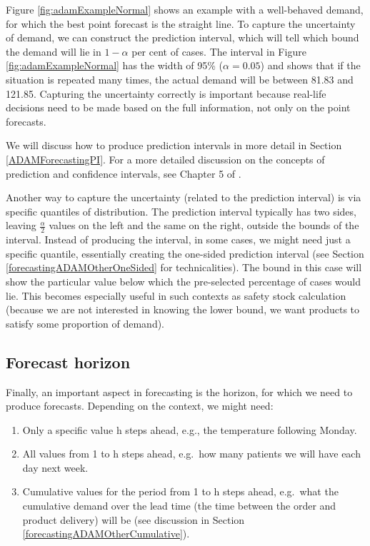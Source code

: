 \documentclass[
]{book}
\providecommand{\tightlist}{%
  \setlength{\itemsep}{0pt}\setlength{\parskip}{0pt}}
\theoremstyle{definition}
\theoremstyle{definition}
\theoremstyle{definition}
\theoremstyle{definition}
\theoremstyle{remark}
\begin{document}
Figure \ref{fig:adamExampleNormal} shows an example with a well-behaved demand, for which the best point forecast is the straight line. To capture the uncertainty of demand, we can construct the prediction interval, which will tell which bound the demand will lie in \(1-\alpha\) per cent of cases. The interval in Figure \ref{fig:adamExampleNormal} has the width of 95\% (\(\alpha=0.05\)) and shows that if the situation is repeated many times, the actual demand will be between 81.83 and 121.85. Capturing the uncertainty correctly is important because real-life decisions need to be made based on the full information, not only on the point forecasts.

We will discuss how to produce prediction intervals in more detail in Section \ref{ADAMForecastingPI}. For a more detailed discussion on the concepts of prediction and confidence intervals, see Chapter 5 of \citet{SvetunkovSBA}.

Another way to capture the uncertainty (related to the prediction interval) is via specific quantiles of distribution. The prediction interval typically has two sides, leaving \(\frac{\alpha}{2}\) values on the left and the same on the right, outside the bounds of the interval. Instead of producing the interval, in some cases, we might need just a specific quantile, essentially creating the one-sided prediction interval (see Section \ref{forecastingADAMOtherOneSided} for technicalities). The bound in this case will show the particular value below which the pre-selected percentage of cases would lie. This becomes especially useful in such contexts as safety stock calculation (because we are not interested in knowing the lower bound, we want products to satisfy some proportion of demand).

\hypertarget{forecast-horizon}{%
\subsection{Forecast horizon}\label{forecast-horizon}}

Finally, an important aspect in forecasting is the horizon, for which we need to produce forecasts. Depending on the context, we might need:

\begin{enumerate}
\def\labelenumi{\arabic{enumi}.}
\tightlist
\item
  Only a specific value h steps ahead, e.g., the temperature following Monday.
\item
  All values from 1 to h steps ahead, e.g.~how many patients we will have each day next week.
\item
  Cumulative values for the period from 1 to h steps ahead, e.g.~what the cumulative demand over the lead time (the time between the order and product delivery) will be (see discussion in Section \ref{forecastingADAMOtherCumulative}).
\end{enumerate}
\end{document}
